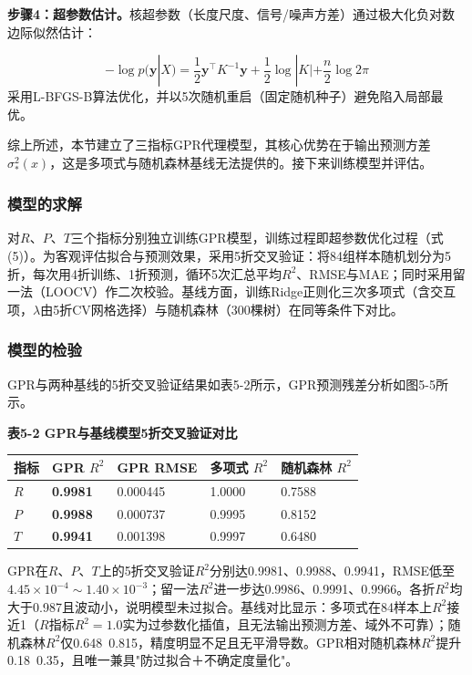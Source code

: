 \documentclass[withoutpreface]{cumcmthesis}
\begin{document}
\textbf{步骤4：超参数估计。}核超参数（长度尺度、信号/噪声方差）通过极大化负对数边际似然估计：

\begin{equation}
-\log p(\mathbf{y}|X)=\frac{1}{2}\mathbf{y}^{\top}K^{-1}\mathbf{y}+\frac{1}{2}\log|K|+\frac{n}{2}\log 2\pi \tag{5}
\end{equation}
采用L-BFGS-B算法优化，并以5次随机重启（固定随机种子）避免陷入局部最优。

综上所述，本节建立了三指标GPR代理模型，其核心优势在于输出预测方差$\sigma_*^2(x)$，这是多项式与随机森林基线无法提供的。接下来训练模型并评估。

\subsubsection{模型的求解}
对$R$、$P$、$T$三个指标分别独立训练GPR模型，训练过程即超参数优化过程（式(5)）。为客观评估拟合与预测效果，采用5折交叉验证：将84组样本随机划分为5折，每次用4折训练、1折预测，循环5次汇总平均$R^2$、RMSE与MAE；同时采用留一法（LOOCV）作二次校验。基线方面，训练Ridge正则化三次多项式（含交互项，$\lambda$由5折CV网格选择）与随机森林（300棵树）在同等条件下对比。

\subsubsection{模型的检验}
GPR与两种基线的5折交叉验证结果如表5-2所示，GPR预测残差分析如图5-5所示。

\textbf{表5-2 GPR与基线模型5折交叉验证对比}

\begin{table}[htbp]
\centering
\small
\begin{tabularx}{\textwidth}{XXXXX}
\toprule
指标 & GPR $R^2$ & GPR RMSE & 多项式 $R^2$ & 随机森林 $R^2$ \\
\midrule
$R$ & \textbf{0.9981} & 0.000445 & 1.0000 & 0.7588 \\
$P$ & \textbf{0.9988} & 0.000737 & 0.9995 & 0.8152 \\
$T$ & \textbf{0.9941} & 0.001398 & 0.9997 & 0.6480 \\
\bottomrule
\end{tabularx}
\end{table}
GPR在$R$、$P$、$T$上的5折交叉验证$R^2$分别达0.9981、0.9988、0.9941，RMSE低至$4.45\times10^{-4}\sim1.40\times10^{-3}$；留一法$R^2$进一步达0.9986、0.9991、0.9966。各折$R^2$均大于0.987且波动小，说明模型未过拟合。基线对比显示：多项式在84样本上$R^2$接近1（$R$指标$R^2=1.0$实为过参数化插值，且无法输出预测方差、域外不可靠）；随机森林$R^2$仅0.648~0.815，精度明显不足且无平滑导数。GPR相对随机森林$R^2$提升0.18~0.35，且唯一兼具"防过拟合＋不确定度量化"。
\end{document}
